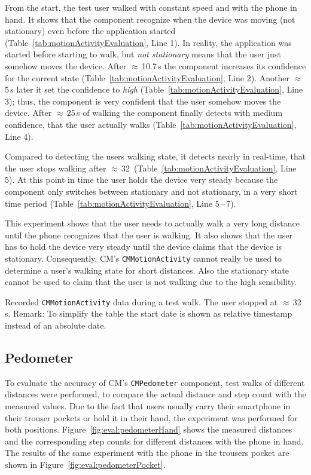 From the start, the test user walked with constant speed and with the phone in hand. It shows that the component recognize when the device was moving (not stationary) even before the application started (Table~\ref{tab:motionActivityEvaluation}, Line 1). In reality, the application was started before starting to walk, but \emph{not stationary} means that the user just somehow moves the device. After $\approx$\,10.7\,s the component increases its confidence for the current state (Table~\ref{tab:motionActivityEvaluation}, Line 2). Another $\approx$5\,s later it set the confidence to \emph{high} (Table~\ref{tab:motionActivityEvaluation}, Line 3); thus, the component is very confident that the user somehow moves the device. After $\approx$\,25\,s of walking the component finally detects with medium confidence, that the user actually walks (Table~\ref{tab:motionActivityEvaluation}, Line 4).

Compared to detecting the users walking state, it detects nearly in real-time, that the user stops walking after $\approx$\,32\, (Table~\ref{tab:motionActivityEvaluation}, Line 5). At this point in time the user holds the device very steady because the component only switches between stationary and not stationary, in a very short time period (Table~\ref{tab:motionActivityEvaluation}, Line 5\,--\,7).

This experiment shows that the user needs to actually walk a very long distance until the phone recognizes that the user is walking. It also shows that the user has to hold the device very steady until the device claims that the device is stationary. Consequently, \ac{CM}'s \texttt{CMMotionActivity} cannot really be used to determine a user's walking state for short distances. Also the stationary state cannot be used to claim that the user is not walking due to the high sensibility.

\begin{table}
	
	\caption{Recorded \texttt{CMMotionActivity} data during a test walk. The user stopped at $\approx$\,32\,s. Remark: To simplify the table the start date is shown as relative timestamp instead of an absolute date.}
	\label{tab:motionActivityEvaluation}
\end{table}


\subsection{Pedometer}
To evaluate the accuracy of \ac{CM}'s \texttt{CMPedometer} component, test walks of different distances  were performed, to compare the actual distance and step count with the measured values. Due to the fact that users usually carry their smartphone in their trouser pockets or hold it in their hand, the experiment was performed for both positions. Figure~\ref{fig:eval:pedometerHand} shows the measured distances and the corresponding step counts for different distances with the phone in hand. The results of the same experiment with the phone in the trousers pocket are shown in Figure~\ref{fig:eval:pedometerPocket}.

